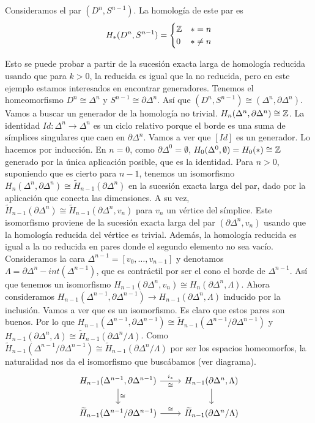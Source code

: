 \documentclass[TA.tex]{subfiles}
\begin{document}
\begin{ej}
Consideramos el par $(D^n,S^{n-1})$. La homología de este par es $$H_*(D^n,S^{n-1})=\begin{cases}
\mathbb{Z} & *=n\\
0 & *\neq n
\end{cases}$$

Esto se puede probar a partir de la sucesión exacta larga de homología reducida usando que para $k>0$, la reducida es igual que la no reducida, pero en este ejemplo estamos interesados en encontrar generadores. Tenemos el homeomorfismo $D^n\cong\Delta^n$ y $S^{n-1}\cong\partial\Delta^n$. Así que $(D^n,S^{n-1})\cong (\Delta^n, \partial\Delta^n)$. Vamos a buscar un generador de la homología no trivial. $H_n(\Delta^n,\partial\Delta^n)\cong\mathbb{Z}$. La identidad $Id:\Delta^n\to\Delta^n$ es un ciclo relativo porque el borde es una suma de símplices singulares que caen en $\partial\Delta^n$. Vamos a ver que $[Id]$ es un generador. Lo hacemos por inducción. En $n=0$, como $\partial\Delta^0=\emptyset$, $H_0(\Delta^0,\emptyset)=H_0(*)\cong\mathbb{Z}$ generado por la única aplicación posible, que es la identidad. Para $n>0$, suponiendo que es cierto para $n-1$, tenemos un isomorfismo $H_n(\Delta^n,\partial\Delta^n)\cong \widetilde{H}_{n-1}(\partial\Delta^n)$ en la sucesión exacta larga del par, dado por la aplicación que conecta las dimensiones. A su vez, $\widetilde{H}_{n-1}(\partial\Delta^n)\cong \widetilde{H}_{n-1}(\partial\Delta^n,v_n)$ para $v_n$ un vértice del símplice. Este isomorfismo proviene de la sucesión exacta larga del par $(\partial\Delta^n,v_n)$ usando que la homología reducida del vértice es trivial. Además, la homología reducida es igual a la no reducida en pares donde el segundo elemento no sea vacío. Consideramos la cara $\Delta^{n-1}=[v_0,\dots, v_{n-1}]$ y denotamos $\Lambda=\partial\Delta^n-int(\Delta^{n-1})$, que es contráctil por ser el cono el borde de $\Delta^{n-1}$. Así que tenemos un isomorfismo $H_{n-1}(\partial\Delta^n,v_n)\cong H_n(\partial\Delta^n,\Lambda)$. Ahora consideramos $H_{n-1}(\Delta^{n-1},\partial\Delta^{n-1})\to H_{n-1}(\partial\Delta^n,\Lambda)$ inducido por la inclusión. Vamos a ver que es un isomorfismo. Es claro que estos pares son buenos. Por lo que $H_{n-1}(\Delta^{n-1},\partial\Delta^{n-1})\cong \widetilde{H}_{n-1}(\Delta^{n-1}/\partial\Delta^{n-1})$ y $H_{n-1}(\partial\Delta^n,\Lambda)\cong\widetilde{H}_{n-1}(\partial\Delta^n/\Lambda)$. Como $\widetilde{H}_{n-1}(\Delta^{n-1}/\partial\Delta^{n-1})\cong  \widetilde{H}_{n-1}(\partial\Delta^n/\Lambda)$ por ser los espacios homeomorfos, la naturalidad nos da el isomorfismo que buscábamos (ver diagrama).
\[
\begin{tikzcd}
H_{n-1}(\Delta^{n-1},\partial\Delta^{n-1})\arrow[r, "i_*", "\cong"']\arrow[d, "\cong"] & H_{n-1}(\partial\Delta^n,\Lambda)\arrow[d]\\
\widetilde{H}_{n-1}(\Delta^{n-1}/\partial\Delta^{n-1})\arrow[r, "\cong"] & \widetilde{H}_{n-1}(\partial\Delta^n/\Lambda)
\end{tikzcd}
\] 


\end{ej}
\end{document}
